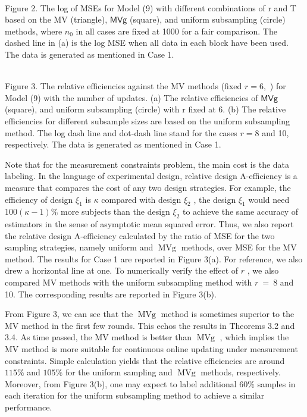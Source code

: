 \\
Figure 2. The log of MSEs for Model (9) with different combinations of r
and T based on the MV (triangle), \(\mathsf { M V } \mathsf { g }\)
(square), and uniform subsampling (circle) methods, where \(n _ { 0 }\)
in all cases are fixed at 1000 for a fair comparison. The dashed line in
(a) is the log MSE when all data in each block have been used. The data
is generated as mentioned in Case 1.

\\
Figure 3. The relative efficiencies against the MV methods (fixed
\(r = 6 ,\) ) for Model (9) with the number of updates. (a) The relative
efficiencies of \(\mathsf { M V } \mathsf { g }\) (square), and uniform
subsampling (circle) with r fixed at 6. (b) The relative efficiencies
for different subsample sizes are based on the uniform subsampling
method. The log dash line and dot-dash line stand for the cases
\(r = 8\) and 10, respectively. The data is generated as mentioned in
Case 1.

Note that for the measurement constraints problem, the main cost is the
data labeling. In the language of experimental design, relative design
A-efficiency is a measure that compares the cost of any two design
strategies. For example, the efficiency of design \(\xi _ { 1 }\) is
\(\kappa\) compared with design \(\xi _ { 2 }\) , the design
\(\xi _ { 1 }\) would need \(1 0 0 ( \kappa - 1 ) \%\) more subjects
than the design \(\xi _ { 2 }\) to achieve the same accuracy of
estimators in the sense of asymptotic mean squared error. Thus, we also
report the relative design A-efficiency calculated by the ratio of MSE
for the two sampling strategies, namely uniform and
\(\operatorname { M V g }\) methods, over MSE for the MV method. The
results for Case 1 are reported in Figure 3(a). For reference, we also
drew a horizontal line at one. To numerically verify the effect of \(r\)
, we also compared MV methods with the uniform subsampling method with
\(r \ = \ 8\) and 10. The corresponding results are reported in Figure
3(b).

From Figure 3, we can see that the \(\operatorname { M V g }\) method is
sometimes superior to the MV method in the first few rounds. This echos
the results in Theorems 3.2 and 3.4. As time passed, the MV method is
better than \(\operatorname { M V g }\) , which implies the MV method is
more suitable for continuous online updating under measurement
constraints. Simple calculation yields that the relative efficiencies
are around \(1 1 5 \%\) and \(1 0 5 \%\) for the uniform sampling and
\(\operatorname { M V g }\) methods, respectively. Moreover, from Figure
3(b), one may expect to label additional \(6 0 \%\) samples in each
iteration for the uniform subsampling method to achieve a similar
performance.

